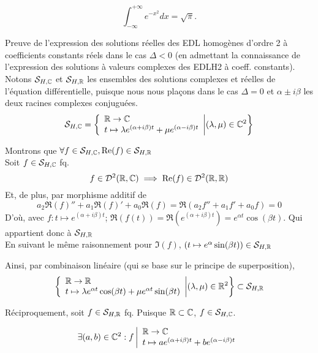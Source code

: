 \documentclass{article}
\begin{document}
\begin{equation}
\int_{-\infty }^{+\infty} e^{-x^2}dx = \sqrt{\pi}.
\end{equation}


\flushleft

\begin{question_kholle}{Preuve de l’expression des solutions réelles des EDL homogènes d’ordre 2 à coefficients constants réels dans le cas $\Delta < 0$ (en admettant la connaissance de l’expression des solutions à valeurs complexes des EDLH2 à coeff. constants).}
	Notons $\mathcal S_{H, \mathbb C}$ et $\mathcal S_{H, \mathbb R}$ les ensembles des solutions complexes et réelles de l'équation différentielle, puisque nous nous plaçons dans le cas $\Delta = 0$ et $\alpha \pm i \beta$ les deux racines complexes conjuguées.
	$$
	\mathcal S_{H, \mathbb C} = 
	\left\{ 
	\begin{array}{l}
    \mathbb R \to \mathbb C  \\
    t \mapsto \lambda e^{(\alpha + i \beta) t}  + \mu e^{(\alpha - i \beta)t}
  \end{array}
	\middle\vert  (\lambda, \mu) \in \mathbb C ^2 \right\}	
	$$
	
	Montrons que $\forall f \in \mathcal S_{H ,\mathbb C}, \text{Re}(f) \in  \mathcal S_{H ,\mathbb R}$\\
	Soit $f \in \mathcal S_{H ,\mathbb C}$ fq.
	$$f \in \mathcal D^2(\mathbb R, \mathbb C) \implies \text{Re}(f) \in \mathcal D^2(\mathbb R, \mathbb R)$$
	Et, de plus, par morphisme additif de \Re
	$$
	a_2\Re(f)'' + a_1\Re(f)' + a_0\Re(f) = \Re( a_2 f'' + a_1 f' + a_0 f) = 0
	$$
	D'où, avec $f:t \mapsto e^{(\alpha + i \beta)t}$; $\Re(f(t)) = \Re(e^{(\alpha + i \beta)t}) = e^{\alpha t } \cos (\beta t)$. Qui appartient donc à $\mathcal S_{H, \mathbb R}$\\
	En suivant le même raisonnement pour $\Im(f)$, $(t \mapsto e^\alpha \sin(\beta t)) \in \mathcal S_{H, \mathbb R}$
	
	
	Ainsi, par combinaison linéaire (qui se base sur le principe de superposition),
	$$
	\left\{ 
	\begin{array}{l}
    \mathbb R \to \mathbb R  \\
    t \mapsto \lambda e^{\alpha t } \cos (\beta t)   + \mu e^{\alpha t } \sin (\beta t)
  \end{array}
	\middle\vert  (\lambda, \mu) \in \mathbb R ^2 \right\}
	\subset \mathcal S_{H ,\mathbb R}
	$$
	
	Réciproquement, soit $ f \in \mathcal S_{H ,\mathbb R}$ fq. Puisque $\mathbb R \subset \mathbb C$,  $ f \in \mathcal S_{H ,\mathbb C}$.
	
	$$
	\exists (a, b) \in \mathbb C^2 : f \left| \begin{array}{l}
    \mathbb R \to \mathbb C  \\
    t \mapsto a e^{(\alpha + i \beta) t}  + b e^{(\alpha - i \beta)t}
	\end{array}\right.$$


\end{question_kholle}
\end{document}
